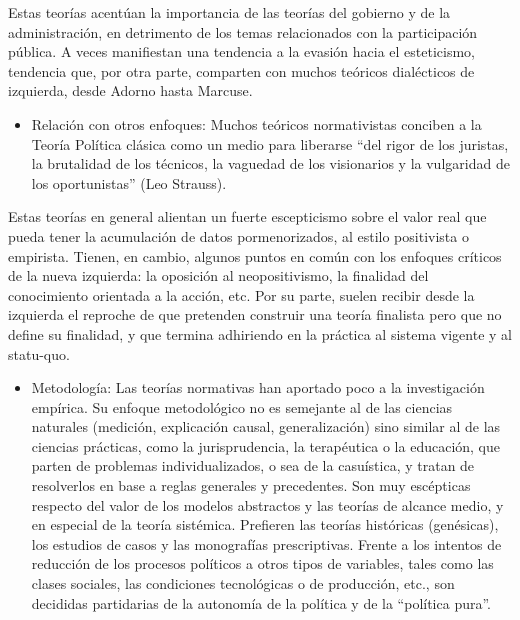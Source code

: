 \documentclass[
]{book}
\providecommand{\tightlist}{%
  \setlength{\itemsep}{0pt}\setlength{\parskip}{0pt}}
\begin{document}
Estas teorías acentúan la importancia de las teorías del gobierno y de la administración, en detrimento de los temas relacionados con la participación pública. A veces manifiestan una tendencia a la evasión hacia el esteticismo, tendencia que, por otra parte, comparten con muchos teóricos dialécticos de izquierda, desde Adorno hasta Marcuse.

\begin{itemize}
\tightlist
\item
  Relación con otros enfoques: Muchos teóricos normativistas conciben a la Teoría Política clásica como un medio para liberarse ``del rigor de los juristas, la brutalidad de los técnicos, la vaguedad de los visionarios y la vulgaridad de los oportunistas'' (Leo Strauss).
\end{itemize}

Estas teorías en general alientan un fuerte escepticismo sobre el valor real que pueda tener la acumulación de datos pormenorizados, al estilo positivista o empirista. Tienen, en cambio, algunos puntos en común con los enfoques críticos de la nueva izquierda: la oposición al neopositivismo, la finalidad del conocimiento orientada a la acción, etc. Por su parte, suelen recibir desde la izquierda el reproche de que pretenden construir una teoría finalista pero que no define su finalidad, y que termina adhiriendo en la práctica al sistema vigente y al statu-quo.

\begin{itemize}
\tightlist
\item
  Metodología: Las teorías normativas han aportado poco a la investigación empírica. Su enfoque metodológico no es semejante al de las ciencias naturales (medición, explicación causal, generalización) sino similar al de las ciencias prácticas, como la jurisprudencia, la terapéutica o la educación, que parten de problemas individualizados, o sea de la casuística, y tratan de resolverlos en base a reglas generales y precedentes. Son muy escépticas respecto del valor de los modelos abstractos y las teorías de alcance medio, y en especial de la teoría sistémica. Prefieren las teorías históricas (genésicas), los estudios de casos y las monografías prescriptivas. Frente a los intentos de reducción de los procesos políticos a otros tipos de variables, tales como las clases sociales, las condiciones tecnológicas o de producción, etc., son decididas partidarias de la autonomía de la política y de la ``política pura''.
\end{itemize}
\end{document}
